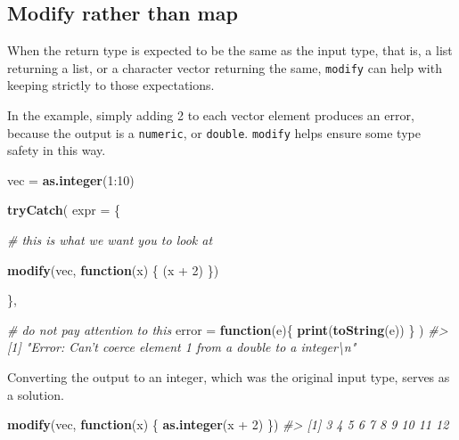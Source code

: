 \documentclass[]{book}
\newenvironment{Shaded}{}{}
\newcommand{\CommentTok}[1]{\textcolor[rgb]{0.38,0.63,0.69}{\textit{#1}}}
\newcommand{\ControlFlowTok}[1]{\textcolor[rgb]{0.00,0.44,0.13}{\textbf{#1}}}
\newcommand{\DataTypeTok}[1]{\textcolor[rgb]{0.56,0.13,0.00}{#1}}
\newcommand{\DecValTok}[1]{\textcolor[rgb]{0.25,0.63,0.44}{#1}}
\newcommand{\KeywordTok}[1]{\textcolor[rgb]{0.00,0.44,0.13}{\textbf{#1}}}
\newcommand{\NormalTok}[1]{#1}
\newcommand{\OperatorTok}[1]{\textcolor[rgb]{0.40,0.40,0.40}{#1}}
\newcommand{\StringTok}[1]{\textcolor[rgb]{0.25,0.44,0.63}{#1}}
\begin{document}
\hypertarget{modify-rather-than-map}{%
\subsection{Modify rather than map}\label{modify-rather-than-map}}

When the return type is expected to be the same as the input type, that is, a list returning a list, or a character vector returning the same, \texttt{modify} can help with keeping strictly to those expectations.

In the example, simply adding 2 to each vector element produces an error, because the output is a \texttt{numeric}, or \texttt{double}. \texttt{modify} helps ensure some type safety in this way.

\begin{Shaded}
\begin{Highlighting}[]
\NormalTok{vec =}\StringTok{ }\KeywordTok{as.integer}\NormalTok{(}\DecValTok{1}\OperatorTok{:}\DecValTok{10}\NormalTok{)}

\KeywordTok{tryCatch}\NormalTok{(}
  \DataTypeTok{expr =}\NormalTok{ \{}

    \CommentTok{# this is what we want you to look at}

    \KeywordTok{modify}\NormalTok{(vec, }\ControlFlowTok{function}\NormalTok{(x) \{ (x }\OperatorTok{+}\StringTok{ }\DecValTok{2}\NormalTok{) \})}

\NormalTok{  \},}

  \CommentTok{# do not pay attention to this}
  \DataTypeTok{error =} \ControlFlowTok{function}\NormalTok{(e)\{}
    \KeywordTok{print}\NormalTok{(}\KeywordTok{toString}\NormalTok{(e))}
\NormalTok{  \}}
\NormalTok{)}
\CommentTok{#> [1] "Error: Can't coerce element 1 from a double to a integer\textbackslash{}n"}
\end{Highlighting}
\end{Shaded}

Converting the output to an integer, which was the original input type, serves as a solution.

\begin{Shaded}
\begin{Highlighting}[]
\KeywordTok{modify}\NormalTok{(vec, }\ControlFlowTok{function}\NormalTok{(x) \{ }\KeywordTok{as.integer}\NormalTok{(x }\OperatorTok{+}\StringTok{ }\DecValTok{2}\NormalTok{) \})}
\CommentTok{#>  [1]  3  4  5  6  7  8  9 10 11 12}
\end{Highlighting}
\end{Shaded}
\end{document}
